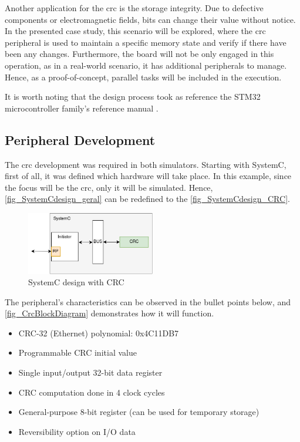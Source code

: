 Another application for the \gls{crc} is the storage integrity. Due to defective components or electromagnetic fields,
bits can change their value without notice. In the presented case study, this scenario will be explored, where 
the \gls{crc} peripheral is used to maintain a specific memory state and verify if there have been any changes. 
Furthermore, the board will not be only engaged in this operation, as in a real-world scenario, it has additional peripherals to manage. 
Hence, as a proof-of-concept, parallel tasks will be included in the execution.

It is worth noting that the design process took as reference the STM32 microcontroller family's reference manual \cite{referenceManualRM0385}.

\subsection{Peripheral Development}

The \gls{crc} development was required in both simulators. Starting with SystemC, first of all, it was defined which hardware will take place.
In this example, since the focus will be the \gls{crc}, only it will be simulated. Hence, \autoref{fig_SystemCdesign_geral} can be redefined to 
the \autoref{fig_SystemCdesign_CRC}.

\begin{figure}[H]
	\centering
	\includegraphics[width=0.5\textwidth]{Images/SystemCdesign_CRC.png}
	\caption{SystemC design with CRC}
	\label{fig_SystemCdesign_CRC}
\end{figure}

The peripheral's characteristics can be observed in the bullet points below, and \autoref{fig_CrcBlockDiagram} demonstrates how it will function.

\begin{itemize}
	\item CRC-32 (Ethernet) polynomial: 0x4C11DB7
	\item Programmable CRC initial value
	\item Single input/output 32-bit data register
	\item CRC computation done in 4 clock cycles 
	\item General-purpose 8-bit register (can be used for temporary storage)
	\item Reversibility option on I/O data
\end{itemize}

